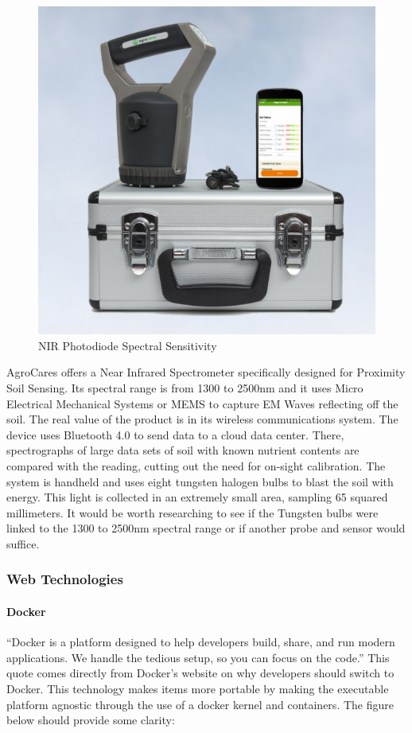 \begin{figure}[H]
    \caption{NIR Photodiode Spectral Sensitivity}
    \centering
    \includegraphics[width=\textwidth]{images/3.2.2Pic.png}
\end{figure}

AgroCares offers a Near Infrared Spectrometer specifically designed for Proximity Soil Sensing. Its spectral range is from 1300 to 2500nm and it uses Micro Electrical Mechanical Systems or MEMS to capture EM Waves reflecting off the soil. The real value of the product is in its wireless communications system. The device uses Bluetooth 4.0 to send data to a cloud data center. There, spectrographs of large data sets of soil with known nutrient contents are compared with the reading, cutting out the need for on-sight calibration. The system is handheld and uses eight tungsten halogen bulbs to blast the soil with energy. This light is collected in an extremely small area, sampling 65 squared millimeters. It would be worth researching to see if the Tungsten bulbs were linked to the 1300 to 2500nm spectral range or if another probe and sensor would suffice.


\subsubsection{Web Technologies}\label{sec:web-tech}
\paragraph{Docker}
``Docker is a platform designed to help developers build, share, and run modern applications. We handle the tedious setup, so you can focus on the code.'' This quote comes directly from Docker's website on why developers should switch to Docker. This technology makes items more portable by making the executable platform agnostic through the use of a docker kernel and containers. The figure below should provide some clarity:

